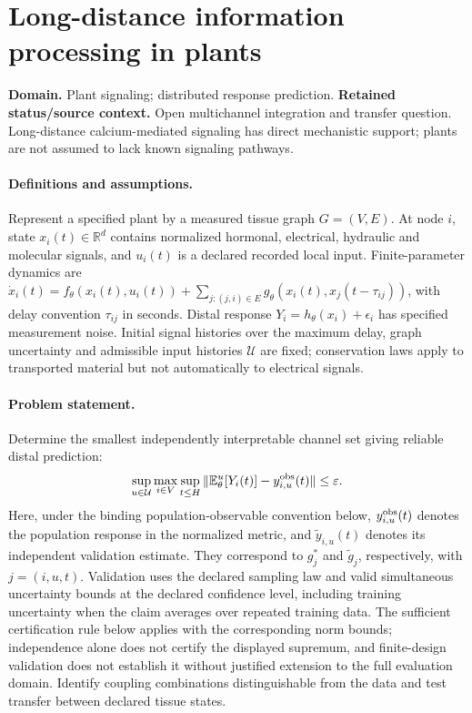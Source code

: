 \documentclass[11pt]{article}
\begin{document}
\section*{Long-distance information processing in plants}
\label{prob:328}
\label{rank:209}
\par\smallskip

\noindent\textbf{Domain.} Plant signaling; distributed response prediction. \quad \textbf{Retained status/source context.} Open multichannel integration and transfer question. Long-distance calcium-mediated signaling has direct mechanistic support; plants are not assumed to lack known signaling pathways.

\paragraph{Definitions and assumptions.} Represent a specified plant by a measured tissue graph $G=(V,E)$. At node $i$, state $x_i(t)\in\mathbb{R}^d$ contains normalized hormonal, electrical, hydraulic and molecular signals, and $u_i(t)$ is a declared recorded local input. Finite-parameter dynamics are $\dot x_i(t)=f_\theta(x_i(t),u_i(t))+\sum_{j:(j,i)\in E}g_\theta(x_i(t),x_j(t-\tau_{ij}))$, with delay convention $\tau_{ij}$ in seconds. Distal response $Y_i=h_\theta(x_i)+\epsilon_i$ has specified measurement noise. Initial signal histories over the maximum delay, graph uncertainty and admissible input histories $\mathcal U$ are fixed; conservation laws apply to transported material but not automatically to electrical signals.

\paragraph{Problem statement.} Determine the smallest independently interpretable channel set giving reliable distal prediction:
    \[\sup_{u\in\mathcal U}\max_{i\in V}
    \sup_{t\leq H}\|\mathbb{E}_\theta^{u}[Y_i(t)]-y^{\rm obs}_{i,u}(t)\|\leq\varepsilon.\]
    Here, under the binding population-observable convention below, $y^{\rm obs}_{i,u}(t)$ denotes the population response in the normalized metric, and $\widetilde y_{i,u}(t)$ denotes its independent validation estimate. They correspond to $g_j^*$ and $\widetilde g_j$, respectively, with $j=(i,u,t)$. Validation uses the declared sampling law and valid simultaneous uncertainty bounds at the declared confidence level, including training uncertainty when the claim averages over repeated training data. The sufficient certification rule below applies with the corresponding norm bounds; independence alone does not certify the displayed supremum, and finite-design validation does not establish it without justified extension to the full evaluation domain. Identify coupling combinations distinguishable from the data and test transfer between declared tissue states.
\end{document}
